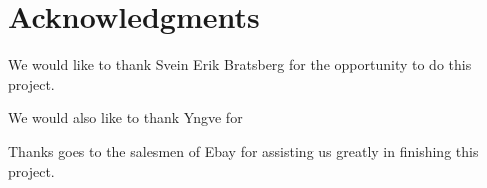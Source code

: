 \clearpage
\section{Acknowledgments}
We would like to thank Svein Erik Bratsberg for the opportunity to do this project.

We would also like to thank Yngve for

Thanks goes to the salesmen of Ebay for assisting us greatly in finishing this project.
